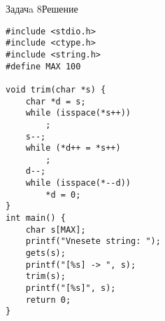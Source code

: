 \begin{frame}[fragile]{Задачa 8}{Решение}
\begin{lstlisting}
#include <stdio.h>
#include <ctype.h>
#include <string.h>
#define MAX 100

void trim(char *s) {
    char *d = s;
    while (isspace(*s++))
        ;
    s--;
    while (*d++ = *s++)
        ;
    d--;
    while (isspace(*--d))
        *d = 0;
}
int main() {
    char s[MAX];
    printf("Vnesete string: ");
    gets(s);
    printf("[%s] -> ", s);
    trim(s);
    printf("[%s]", s);
    return 0;
}
\end{lstlisting}
\end{frame}
